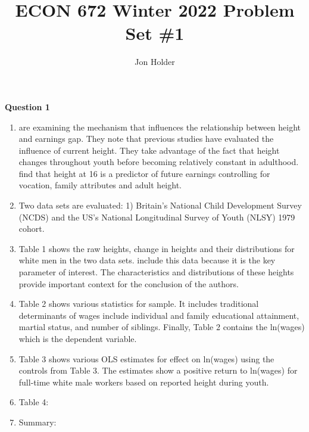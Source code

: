 \documentclass[12pt]{article}
\begin{document}
\title{ECON 672 Winter 2022 Problem Set \#1}
\author{Jon Holder}

\newcommand{\question}[1]{\textbf{\noindent Question #1}}
\newcommand{\tabindent}{\hspace{3mm}}

\newcommand{\todo}{\color{red}{\textbf{TODO}}}

\maketitle
\question{1}
    \begin{enumerate}[\indent a.]
        \item \textcite{Persico2004} are examining the mechanism that 
        influences the relationship between height and earnings gap. They note 
        that previous studies have evaluated the influence of current height.  
        They take advantage of the fact that height changes throughout youth 
        before becoming relatively constant in adulthood. 
        \citeauthor{Persico2004} find that height at 16 is a predictor of 
        future earnings controlling for vocation, family attributes and adult 
        height.
        
        \item Two data sets are evaluated: 1) Britain's National Child 
        Development Survey (NCDS) and the US's National Longitudinal Survey of 
        Youth (NLSY) 1979 cohort.

        \item Table 1 shows the raw heights, change in heights and their 
        distributions for white men in the two data sets. 
        \citeauthor{Persico2004} include this data because it is the key 
        parameter of interest.  The characteristics and distributions of these 
        heights provide important context for the conclusion of the authors.

        \item Table 2 shows various statistics for sample.  It includes 
        traditional determinants of wages include individual and family 
        educational attainment, martial status, and number of siblings. Finally, 
        Table 2 contains the ln(wages) which is the dependent variable.

        \item Table 3 shows various OLS estimates for effect on ln(wages) 
        using the controls from Table 3.  The estimates show a positive return
        to ln(wages) for full-time white male workers based on reported height 
        during youth.
                
        \item Table 4: \todo  
        
        \item Summary: \todo  
    \end{enumerate}
\end{document}
